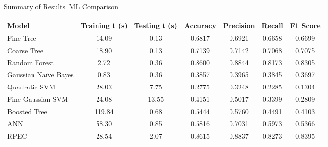 \begin{frame}{Summary of Results: ML Comparison}
\begin{tiny}
    \begin{table}[ht]
    \centering
    \begin{tabular}{|p{8em}|c|c|c|c|c|c|}
        \hline
        \textbf{Model}               & \textbf{Training t (s)} & \textbf{Testing t (s)} & \textbf{Accuracy} & \textbf{Precision} & \textbf{Recall} & \textbf{F1 Score} \\ \hline
        Fine Tree                    & 14.09                      & 0.13                      & 0.6817            & 0.6921             & 0.6658          & 0.6699            \\ \hline
        Coarse Tree                  & 18.90                      & 0.13                      & 0.7139            & 0.7142             & 0.7068          & 0.7075            \\ \hline
        Random Forest                & 2.72                       & 0.36                      & 0.8600            & 0.8844             & 0.8173          & 0.8305            \\ \hline
        Gaussian Naïve Bayes         & 0.83                       & 0.36                      & 0.3857            & 0.3965             & 0.3845          & 0.3697            \\ \hline
        Quadratic SVM                & 28.03                      & 7.75                      & 0.2775            & 0.3248             & 0.2285          & 0.1304            \\ \hline
        Fine Gaussian SVM            & 24.08                      & 13.55                     & 0.4151            & 0.5017             & 0.3399          & 0.2809            \\ \hline
        Boosted Tree                 & 119.84                     & 0.68                      & 0.5444            & 0.5760             & 0.4491          & 0.4103            \\ \hline
        ANN & 58.30                      & 0.85                      & 0.5816            & 0.7031             & 0.5973          & 0.5366            \\ \hline
        RPEC      & 28.54                      & 2.07                      & 0.8615            & 0.8837             & 0.8273          & 0.8395            \\ \hline
    \end{tabular}
    \label{table:flp_models_comparison}
    \end{table}
\end{tiny}
\end{frame}
